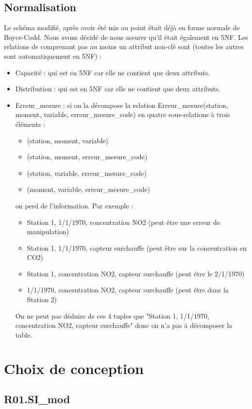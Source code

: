\documentclass{article}
\begin{document}
\subsection{Normalisation}
Le schéma modifié, après avoir été mis au point était déjà en forme normale de 
Boyce-Codd. 
Nous avons décidé de nous assurer qu'il était également en 5NF.
Les relations de comprenant pas au moins un attribut non-clé sont (toutes les autres sont automatiquement en 5NF) :
\begin{itemize}
    \item Capacité : qui est en 5NF car elle ne contient que deux attributs.
    \item Distribution : qui est en 5NF car elle ne contient que deux attributs.
    \item Erreur\_mesure : si on la décompose la relation Erreur\_mesure(station, moment, variable, erreur\_mesure\_code)
en quatre sous-relations à trois éléments :
    \begin{itemize}
        \item (station, moment, variable)
        \item (station, moment, erreur\_mesure\_code)
        \item (station, variable, erreur\_mesure\_code)
        \item (moment, variable, erreur\_mesure\_code)
    \end{itemize}
on perd de l'information. Par exemple :
    \begin{itemize}
        \item Station 1, 1/1/1970, concentration NO2 (peut être une erreur de manipulation)
        \item Station 1, 1/1/1970, capteur surchauffe (peut être sur la concentration en CO2)
        \item Station 1, concentration NO2, capteur surchauffe (peut être le 2/1/1970)
        \item 1/1/1970, concentration NO2, capteur surchauffe (peut être dans la Station 2)
    \end{itemize}
On ne peut pas déduire de ces 4 tuples que "Station 1, 1/1/1970, concentration NO2, capteur surchauffe" donc on n'a pas à décomposer la table.
\end{itemize}


\section{Choix de conception}
\subsection{R01.SI\_mod}
\end{document}
